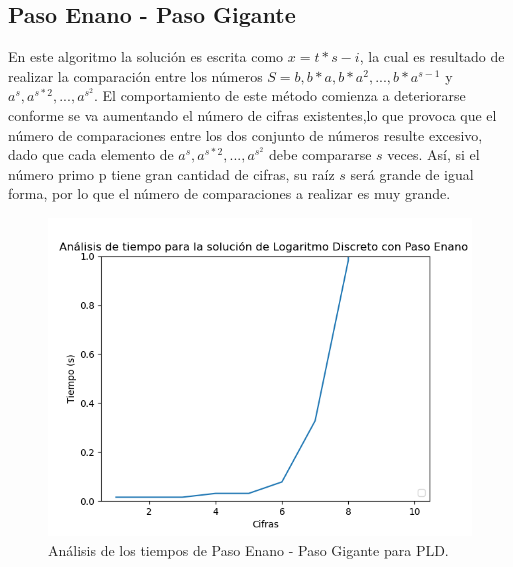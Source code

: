 \documentclass{article}
\begin{document}
    \subsection{Paso Enano - Paso Gigante}
    En este algoritmo la solución es escrita como \begin{math}x=t*s-i\end{math}, la cual es resultado de realizar la comparación entre los números \begin{math}S={b,b*a,b*a^2,...,b*a^{s-1}}\end{math} y \begin{math}{a^s,a^{s*2},...,a^{s^2}}\end{math}. El comportamiento de este método comienza a deteriorarse conforme se va aumentando el número de cifras existentes,lo que provoca que el número de comparaciones entre los dos conjunto de números resulte excesivo, dado que cada elemento de \begin{math}{a^s,a^{s*2},...,a^{s^2}}\end{math} debe compararse \begin{math}{s}\end{math} veces.
    \newblock
    Así, si el número primo p tiene gran cantidad de cifras, su raíz \begin{math}{s}\end{math} será grande de igual forma, por lo que el número de comparaciones a realizar es muy grande.
     \begin{figure}[ht!]
        \centering
        \includegraphics[width=\linewidth]{Figure_8}
        \caption{Análisis de los tiempos de Paso Enano - Paso Gigante para PLD.}
        \label{fig:Figure_6}
    \end{figure}
    \newpage
    
\end{document}
